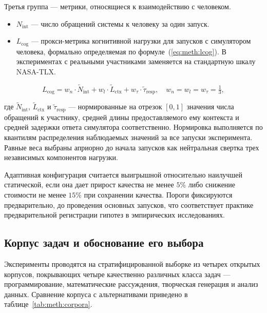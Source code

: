 Третья группа --- метрики, относящиеся к взаимодействию с человеком.

\begin{itemize}[noitemsep]
  \item $N_{\text{int}}$ --- число обращений системы к человеку
        за один запуск.
  \item $L_{\text{cog}}$ --- прокси-метрика когнитивной нагрузки
        для запусков с симулятором человека, формально определяемая
        по формуле~(\ref{eq:meth:lcog}). В экспериментах с реальными
        участниками заменяется на стандартную шкалу NASA-TLX.
\end{itemize}

\begin{equation}
L_{\text{cog}} = w_n \cdot \widetilde{N}_{\text{int}}
              + w_l \cdot \widetilde{L}_{\text{ctx}}
              + w_\tau \cdot \widetilde{\tau}_{\text{resp}},
\quad
w_n = w_l = w_\tau = \tfrac{1}{3},
\label{eq:meth:lcog}
\end{equation}

\noindent где $\widetilde{N}_{\text{int}}$, $\widetilde{L}_{\text{ctx}}$
и $\widetilde{\tau}_{\text{resp}}$ --- нормированные на отрезок
$[0,1]$ значения числа обращений к участнику, средней длины
предоставляемого ему контекста и средней задержки ответа симулятора
соответственно. Нормировка выполняется по квантилям распределения
наблюдаемых значений за все запуски эксперимента. Равные веса
выбраны априорно до начала запусков как нейтральная свертка трех
независимых компонентов нагрузки.

Адаптивная конфигурация считается выигрышной относительно
наилучшей статической, если она дает прирост качества не менее
$5\%$ либо снижение стоимости не менее $15\%$ при сохранении
качества. Пороги фиксируются предварительно, до проведения
основных запусков, что соответствует практике предварительной
регистрации гипотез в эмпирических исследованиях.

\subsection{Корпус задач и обоснование его выбора}
\label{sec:meth:corpus}

Эксперименты проводятся на стратифицированной выборке из четырех
открытых корпусов, покрывающих четыре качественно различных
класса задач --- программирование, математические рассуждения,
творческая генерация и анализ данных. Сравнение корпуса
с альтернативами приведено в таблице~\ref{tab:meth:corpora}.

